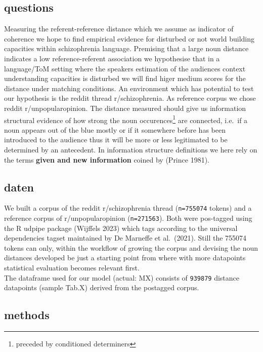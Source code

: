 \documentclass[
]{article}
\begin{document}
\subsection{questions}\label{questions}

Measuring the referent-reference distance which we assume as indicator of coherence we hope to find empirical evidence for disturbed or not world building capacities within schizophrenia language. Premising that a large noun distance indicates a low reference-referent association we hypothesise that in a language/ToM setting where the speakers estimation of the audiences context understanding capacities is disturbed we will find higer medium scores for the distance under matching conditions. An environment which has potential to test our hypothesis is the reddit thread r/schizophrenia. As reference corpus we chose reddit r/unpopularopinion.
The distance measured should give us information structural evidence of how strong the noun occurences\footnote{preceded by conditioned determiners} are connected, i.e.~if a noun appears out of the blue mostly or if it somewhere before has been introduced to the audience thus it will be more or less legitimated to be determined by an antecedent. In information structure definitions we here rely on the terms \textbf{given and new information} coined by (Prince 1981).

\subsection{daten}\label{daten}

We built a corpus of the reddit r/schizophrenia thread (\texttt{n=755074} tokens) and a reference corpus of r/unpopularopinion (\texttt{n=271563}). Both were pos-tagged using the R udpipe package (Wijffels 2023) which tags according to the universal dependencies tagset maintained by De Marneffe et al.~(2021). Still the 755074 tokens can only, within the workflow of growing the corpus and devising the noun distances developed be just a starting point from where with more datapoints statistical evaluation becomes relevant first.\\
The dataframe used for our model (actual: MX) consists of \texttt{939879} distance datapoints (sample Tab.X) derived from the postagged corpus.

\subsection{methods}\label{methods}
\end{document}
